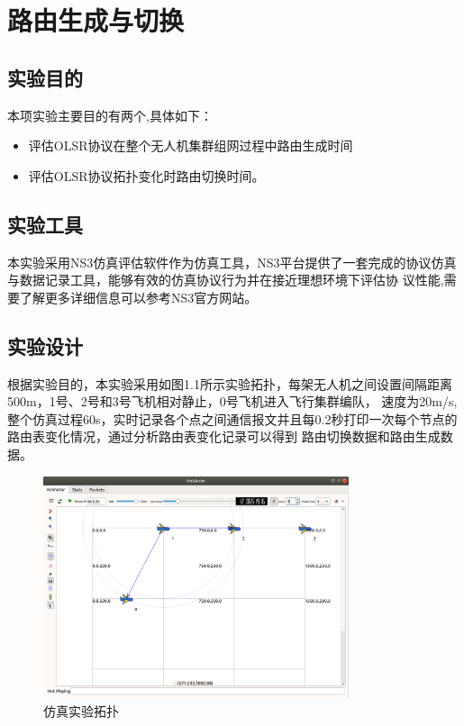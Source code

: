 \documentclass[a4paper,12pt]{report}
\begin{document}
\tableofcontents %

\chapter{路由生成与切换}
\setcounter{page}{1}
\begin{spacing}{1.5}
\songti{}

\section{实验目的}
本项实验主要目的有两个,具体如下：
\begin{itemize}
\itemsep=3pt
\parskip=0pt
\item 评估OLSR协议在整个无人机集群组网过程中路由生成时间
\item 评估OLSR协议拓扑变化时路由切换时间。
\end{itemize}
\section{实验工具}
本实验采用NS3仿真评估软件作为仿真工具，NS3平台提供了一套完成的协议仿真与数据记录工具，能够有效的仿真协议行为并在接近理想环境下评估协
议性能,需要了解更多详细信息可以参考NS3官方网站\cite{NS3.web}。
\section{实验设计}
根据实验目的，本实验采用如图1.1所示实验拓扑，每架无人机之间设置间隔距离500m，1号、2号和3号飞机相对静止，0号飞机进入飞行集群编队，
速度为20m/s,整个仿真过程60s，实时记录各个点之间通信报文并且每0.2秒打印一次每个节点的路由表变化情况，通过分析路由表变化记录可以得到
路由切换数据和路由生成数据。
\begin{figure}[hbtp]
	\centering
	\includegraphics [width=0.8\textwidth]{figure//topo.png}
	\caption{仿真实验拓扑}\label{topo}
\end{figure}


\end{spacing}
\end{document}
